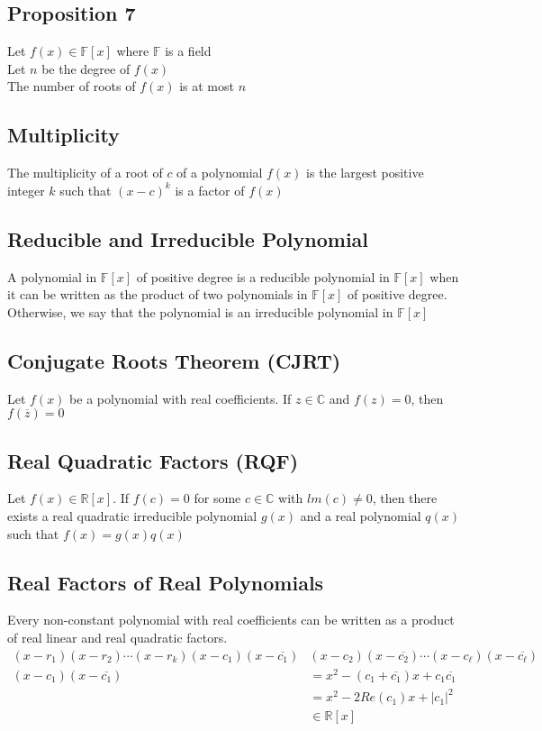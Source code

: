 \documentclass[12pt, letterpaper]{article}
\begin{document}
\subsection{Proposition 7}
Let $f(x) \in \mathbb{F}[x]$ where $\mathbb{F}$ is a field \\
Let $n$ be the degree of $f(x)$ \\
The number of roots of $f(x)$ is at most $n$
\subsection{Multiplicity}
The multiplicity of a root of $c$ of a polynomial $f(x)$ is the largest positive integer $k$ such that $(x-c)^k$ is a factor of $f(x)$
\subsection{Reducible and Irreducible Polynomial}
A polynomial in $\mathbb{F}[x]$ of positive degree is a reducible polynomial in $\mathbb{F}[x]$ when it can be written as the product of two polynomials in
$\mathbb{F}[x]$ of positive degree. Otherwise, we say that the polynomial is an irreducible polynomial in $\mathbb{F}[x]$
\subsection{Conjugate Roots Theorem (CJRT)}
Let $f(x)$ be a polynomial with real coefficients. If $z\in\mathbb{C}$ and $f(z) = 0$, then $f(\overline{z}) = 0$
\subsection{Real Quadratic Factors (RQF)}
Let $f(x) \in \mathbb{R}[x]$. If $f(c) = 0$ for some $c\in\mathbb{C}$ with $lm(c) \neq 0$, then there exists a real quadratic irreducible polynomial $g(x)$ and a real
polynomial $q(x)$ such that $f(x) = g(x) q(x)$
\subsection{Real Factors of Real Polynomials}
Every non-constant polynomial with real coefficients can be written as a product of real 
linear and real quadratic factors.
\begin{align*}
    (x-r_1)(x-r_2) \cdots (x-r_k)(x-c_1)(x-\overline{c_1}) &(x-c_2)(x-\overline{c_2}) \cdots (x-c_\ell)(x-\overline{c_\ell}) \\
    (x-c_1)(x-\overline{c_1}) &= x^2 - (c_1 + \overline{c_1})x + c_1 \overline{c_1} \\
                              &= x^2 - 2Re(c_1)x + |c_1|^2 \\
                              &\in \mathbb{R}[x]
\end{align*}
\end{document}
